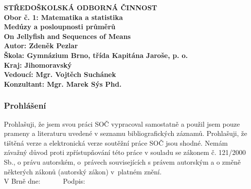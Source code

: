 \documentclass[12pt]{report}
\begin{document}
\begin{titlepage}
{
\centering
\LARGE \textbf{STŘEDOŠKOLSKÁ ODBORNÁ ČINNOST}\\
\Large\textbf{Obor č. 1: Matematika a statistika}\\
\vspace{6cm}
\LARGE\textbf{Medúzy a posloupnosti průměrů}\\
\vspace{1cm}
\LARGE\textbf{On Jellyfish and Sequences of Means}\\
}
\vspace{6cm}
{\noindent\large\bfseries Autor: Zdeněk Pezlar\\ 
	\large\bfseries Škola: Gymnázium Brno, třída Kapitána Jaroše, p. o.\\
    \large\bfseries Kraj: Jihomoravský \\
	\large\bfseries Vedoucí: Mgr. Vojtěch Suchánek\\
	 \large\bfseries Konzultant: Mgr. Marek Sýs Phd.	
	}
	

\end{titlepage}

\newpage
\thispagestyle{empty}
\vspace*{14cm}
\subsubsection*{Prohlášení}

Prohlašuji, že jsem svou práci SOČ vypracoval samostatně a použil jsem pouze prameny a literaturu uvedené v seznamu bibliografických záznamů.
Prohlašuji, že tištěná verze a elektronická verze soutěžní práce SOČ jsou shodné. 
Nemám závažný důvod proti zpřístupňování této práce v souladu se zákonem č. 121/2000 Sb., o právu autorském, o~právech souvisejících s právem autorským a o změně některých zákonů (autorský zákon) v~platném znění. \\[1cm]
V Brně dne: \dotfill \ \ \ \ \ \  Podpis: \dotfill
\end{document}
